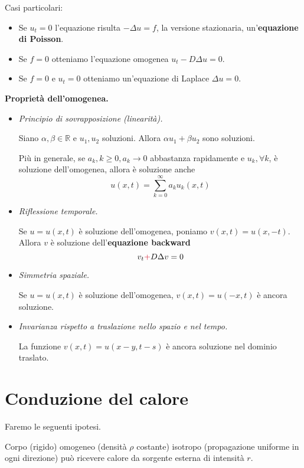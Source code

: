 \documentclass[10pt,a4paper,twoside,openright]{book}
\begin{document}
Casi particolari:
\begin{itemize}
\item Se $u_{t} =0$ l'equazione risulta $-\Delta u=f$, la versione stazionaria, un'\textbf{equazione di Poisson}.
\item Se $f=0$ otteniamo l'equazione omogenea $u_{t} -D\Delta u=0$.
\item Se $f=0$ e $u_{t} =0$ otteniamo un'equazione di Laplace $\Delta u=0$.
\end{itemize}

\textbf{Proprietà dell'omogenea.}
\begin{itemize}
\item \emph{Principio di sovrapposizione (linearità).}

Siano $\alpha,\beta \in \mathbb{R}$ e $u_{1},u_{2}$ soluzioni. Allora $\alpha u_{1} +\beta u_{2}$ sono soluzioni.

Più in generale, se $a_{k},k\geqslant 0,a_{k}\rightarrow 0$ abbastanza rapidamente e $u_{k},\forall k$, è soluzione dell'omogenea, allora è soluzione anche
\begin{equation*}
u(x,t) = \sum\limits ^{\infty }_{k=0} a_{k} u_{k}(x,t)
\end{equation*}

\item \emph{Riflessione temporale.}

Se $u=u(x,t)$ è soluzione dell'omogenea, poniamo $v(x,t) =u(x,-t)$. Allora $v$ è soluzione dell'\textbf{equazione backward}
\begin{equation*}
v_{t}\textcolor[rgb]{0.82,0.01,0.11}{+} D\Delta v=0
\end{equation*}
\item \emph{Simmetria spaziale.}

Se $u=u(x,t)$ è soluzione dell'omogenea, $v(x,t) =u(-x,t)$ è ancora soluzione.

\item \emph{Invarianza rispetto a traslazione nello spazio e nel tempo.}

La funzione $v(x,t) =u(x-y,t-s)$ è ancora soluzione nel dominio traslato.
\end{itemize}

\section{Conduzione del calore}
Faremo le seguenti ipotesi.

Corpo (rigido) omogeneo (densità $\rho $ costante) isotropo (propagazione uniforme in ogni direzione) può ricevere calore da sorgente esterna di intensità $r$.
\end{document}

